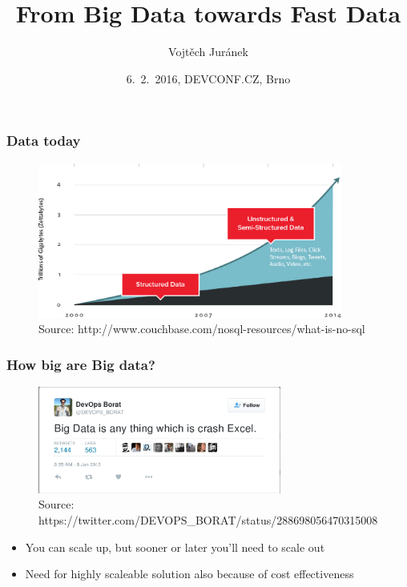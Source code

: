 \documentclass[10pt,utf8]{beamer}
\title{From Big Data towards Fast Data}
\author{Vojtěch Juránek}
\institute[Red Hat]{JBoss - a division by Red Hat}
\date{6.~2.~2016, DEVCONF.CZ, Brno}
\begin{document}
	
\begin{frame}
 \titlepage
\end{frame}
	
\begin{frame}
	\frametitle{Data today}
	\begin{figure}
		\centering
		\includegraphics[width=10cm]{./img/why-nosql-2.eps}
		\caption{\tiny{Source: http://www.couchbase.com/nosql-resources/what-is-no-sql}}
	\end{figure}
	
\end{frame}

\begin{frame}
	\frametitle{How big are Big data?}
	 {
		\begin{figure}
			\centering
			\includegraphics[width=8cm]{./img/borat_big_data.eps}
			\caption{\tiny{Source: https://twitter.com/DEVOPS\_BORAT/status/288698056470315008}}
		\end{figure}
	}
	 {
		\begin{itemize}
			\item You can scale up, but sooner or later you'll need to scale out
			\item Need for highly scaleable solution also because of cost effectiveness
		\end{itemize}
	}
\end{frame}
\end{document}

